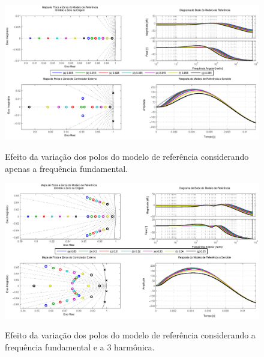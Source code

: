 \documentclass[repeatfields,oneside]{tcc}
\begin{document}
\begin{figure}[!ht]
    \centering
    \caption{Efeito da variação dos polos do modelo de referência considerando apenas a frequência fundamental.}
    \includegraphics[trim={80 20 80 10}, clip, width=\linewidth]{fig/f_1.eps}
    \\
\end{figure}

\begin{figure}[!ht]
    \centering
    \caption{Efeito da variação dos polos do modelo de referência considerando a frequência fundamental e a 3{\textordfeminine} harmônica.}
    \includegraphics[trim={80 20 80 10}, clip, width=\linewidth]{fig/f_3.eps}
    \\
\end{figure}
\end{document}
